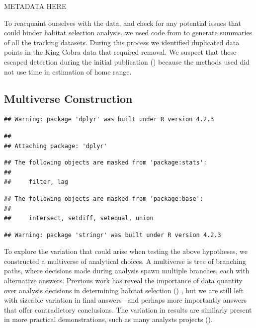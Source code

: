 \documentclass[10pt,a4paper]{article}
\begin{document}
METADATA HERE

To reacquaint ourselves with the data, and check for any potential issues that could hinder habitat selection analysis, we used code from to generate summaries of all the tracking datasets.
During this process we identified duplicated data points in the King Cobra data that required removal.
We suspect that these escaped detection during the initial publication () because the methods used did not use time in estimation of home range.

\subsection{Multiverse Construction}\label{multiverse-construction}

\begin{verbatim}
## Warning: package 'dplyr' was built under R version 4.2.3
\end{verbatim}

\begin{verbatim}
## 
## Attaching package: 'dplyr'
\end{verbatim}

\begin{verbatim}
## The following objects are masked from 'package:stats':
## 
##     filter, lag
\end{verbatim}

\begin{verbatim}
## The following objects are masked from 'package:base':
## 
##     intersect, setdiff, setequal, union
\end{verbatim}

\begin{verbatim}
## Warning: package 'stringr' was built under R version 4.2.3
\end{verbatim}

To explore the variation that could arise when testing the above hypotheses, we constructed a multiverse of analytical choices.
A multiverse is tree of branching paths, where decisions made during analysis spawn multiple branches, each with alternative answers.
Previous work has reveal the importance of data quantity over analysis decisions in determining habitat selection () , but we are still left with sizeable variation in final answers --and perhaps more importantly answers that offer contradictory conclusions.
The variation in results are similarly present in more practical demonstrations, such as many analysts projects ().
\end{document}
